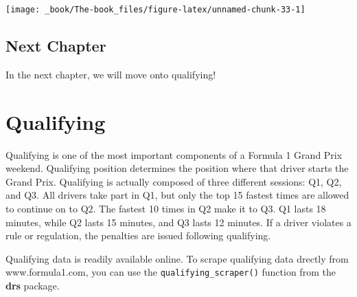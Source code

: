 \documentclass[
]{book}
\begin{document}
\begin{center}\texttt{[image: \_book/The-book\_files/figure-latex/unnamed-chunk-33-1]} \end{center}

\hypertarget{next-chapter}{%
\section{Next Chapter}\label{next-chapter}}

In the next chapter, we will move onto qualifying!

\hypertarget{qualifying}{%
\chapter{Qualifying}\label{qualifying}}

Qualifying is one of the most important components of a Formula 1 Grand Prix weekend. Qualifying position determines the position where that driver starts the Grand Prix. Qualifying is actually composed of three different sessions: Q1, Q2, and Q3. All drivers take part in Q1, but only the top 15 fastest times are allowed to continue on to Q2. The fastest 10 times in Q2 make it to Q3. Q1 lasts 18 minutes, while Q2 lasts 15 minutes, and Q3 lasts 12 minutes. If a driver violates a rule or regulation, the penalties are issued following qualifying.

Qualifying data is readily available online. To scrape qualifying data drectly from www.formula1.com, you can use the \texttt{qualifying\_scraper()} function from the \textbf{drs} package.
\end{document}
